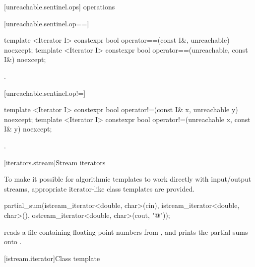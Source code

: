 [unreachable.sentinel.ops]{ operations}

[unreachable.sentinel.op==]{}

%
%
\begin{itemdecl}
template <Iterator I>
  constexpr bool operator==(const I&, unreachable) noexcept;
template <Iterator I>
  constexpr bool operator==(unreachable, const I&) noexcept;
\end{itemdecl}

\begin{itemdescr}
\pnum
\returns {}.
\end{itemdescr}

[unreachable.sentinel.op!=]{}

%
%
\begin{itemdecl}
template <Iterator I>
  constexpr bool operator!=(const I& x, unreachable y) noexcept;
template <Iterator I>
  constexpr bool operator!=(unreachable x, const I& y) noexcept;
\end{itemdecl}

\begin{itemdescr}
\pnum
\returns
{}.
\end{itemdescr}

[iterators.stream]{Stream iterators}

\pnum
To make it possible for algorithmic templates to work directly with input/output streams, appropriate
iterator-like
class templates
are provided.

\enterexample
\begin{codeblock}
partial_sum(istream_iterator<double, char>(cin),
  istream_iterator<double, char>(),
  ostream_iterator<double, char>(cout, "@\textbackslash@n"));
\end{codeblock}

reads a file containing floating point numbers from
,
and prints the partial sums onto
.
\exitexample

[istream.iterator]{Class template }

